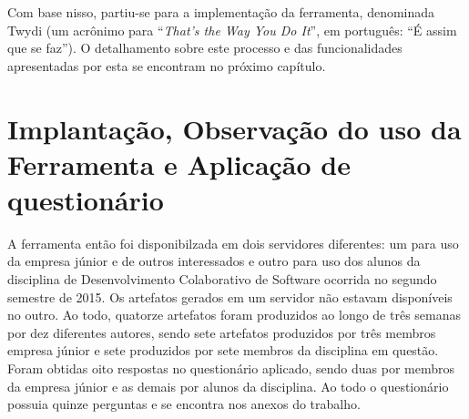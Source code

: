 Com base nisso, partiu-se para a implementação da ferramenta, denominada Twydi (um acrônimo para ``\textit{That's the Way You Do It}'', em português: ``É assim que se faz''). O detalhamento sobre este processo e das funcionalidades apresentadas por esta se encontram no próximo capítulo.

\section{Implantação, Observação do uso da Ferramenta e Aplicação de questionário}

A ferramenta então foi disponibilzada em dois servidores diferentes: um para uso da empresa júnior e de outros interessados e outro para uso dos alunos da disciplina de Desenvolvimento Colaborativo de Software ocorrida no segundo semestre de 2015. Os artefatos gerados em um servidor não estavam disponíveis no outro. Ao todo, quatorze artefatos foram produzidos ao longo de três semanas por dez diferentes autores, sendo sete artefatos produzidos por três membros empresa júnior e sete produzidos por sete membros da disciplina em questão. Foram obtidas oito respostas no questionário aplicado, sendo duas por membros da empresa júnior e as demais por alunos da disciplina. Ao todo o questionário possuia quinze perguntas e se encontra nos anexos do trabalho.

